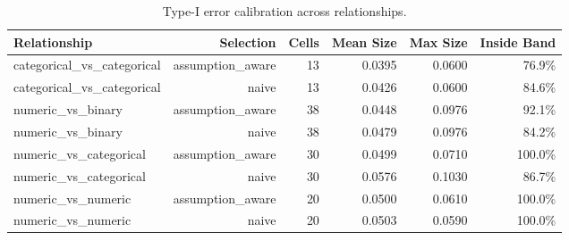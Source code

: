 \begin{table}[htbp]
\centering
\caption{Type-I error calibration across relationships.}
\label{tab:table_e3_calibration}
\begin{tabular}{lrrrrr}
\toprule
Relationship & Selection & Cells & Mean Size & Max Size & Inside Band \\
\midrule
categorical\_vs\_categorical & assumption\_aware & 13 & 0.0395 & 0.0600 & 76.9\% \\
categorical\_vs\_categorical & naive & 13 & 0.0426 & 0.0600 & 84.6\% \\
numeric\_vs\_binary & assumption\_aware & 38 & 0.0448 & 0.0976 & 92.1\% \\
numeric\_vs\_binary & naive & 38 & 0.0479 & 0.0976 & 84.2\% \\
numeric\_vs\_categorical & assumption\_aware & 30 & 0.0499 & 0.0710 & 100.0\% \\
numeric\_vs\_categorical & naive & 30 & 0.0576 & 0.1030 & 86.7\% \\
numeric\_vs\_numeric & assumption\_aware & 20 & 0.0500 & 0.0610 & 100.0\% \\
numeric\_vs\_numeric & naive & 20 & 0.0503 & 0.0590 & 100.0\% \\
\bottomrule
\end{tabular}
\end{table}
